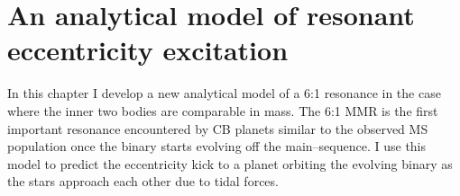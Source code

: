 \documentclass[twoside,openright,titlepage,numbers=noenddot,headinclude,%
                footinclude=true,cleardoublepage=empty,abstractoff, 
                BCOR=5mm,paper=a4,fontsize=11pt,%
                american,%
                ]{scrreprt}%
\begin{document}
\clearpage
\chapter{An analytical model of resonant eccentricity excitation}
\label{ch:analytical_model}
In this chapter I develop a new analytical model of a 6:1 resonance in the case 
where the inner two bodies are 
comparable in mass. The 6:1 MMR is the first important resonance encountered
by CB planets similar to the observed MS population once the 
binary starts evolving off the main--sequence. I use this 
model to predict the eccentricity kick to a planet orbiting the evolving
binary as the stars approach each other due to tidal forces. 
\end{document}
